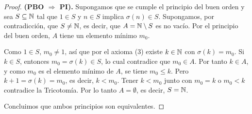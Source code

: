 \documentclass[12pt,a4paper]{article}
\begin{document}
\begin{proof}
        \textbf{(PBO $\Rightarrow$ PI).} Supongamos que se cumple el principio del buen orden y sea $S\subseteq\mathbb{N}$ tal
        que $1\in S$ y $n\in S$ implica $\sigma(n)\in S$. Supongamos, por contradicción, que $S\neq\mathbb{N}$, es decir, que
        $A=\mathbb{N}\setminus S$ es no vacío. Por el principio del buen orden, $A$ tiene un elemento mínimo $m_0$.

        Como $1\in S$, $m_0\neq1$, así que por el axioma (3) existe $k\in\mathbb{N}$ con $\sigma(k)=m_0$. Si $k\in S$, entonces
        $m_0=\sigma(k)\in S$, lo cual contradice que $m_0\in A$. Por tanto $k\in A$, y como $m_0$ es el elemento mínimo
        de $A$, se tiene $m_0\le k$. Pero $k+1=\sigma(k)=m_0$, es decir, $k<m_0$. Tener $k<m_0$ junto con $m_0=k$ o
        $m_0<k$ contradice la Tricotomía. Por lo tanto $A=\emptyset$, es decir, $S=\mathbb{N}$.

        Concluimos que ambos principios son equivalentes.
    \end{proof}
\end{document}
